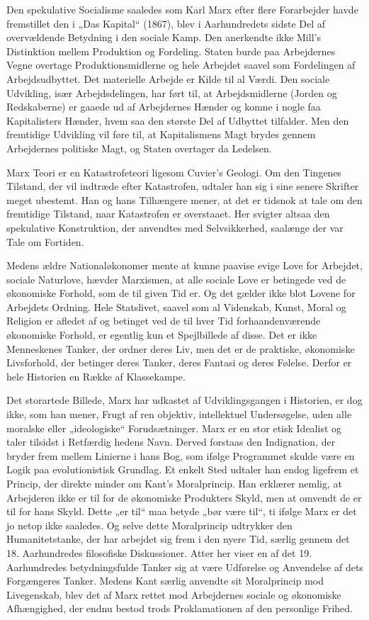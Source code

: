 \documentclass[12pt,a4paper,openany]{book}
\newcommand{\opage}[1]{\marginnote{\footnotesize\textit{[#1]}}}
\begin{document}
Den spekulative Socialisme saaledes som Karl Marx efter flere Forarbejder
havde fremstillet den i „Das Kapital“ (1867), blev i Aarhundredets
sidste Del af overvældende Betydning i den sociale Kamp.
Den anerkendte ikke Mill’s Distinktion mellem Produktion og Fordeling.
Staten burde paa Arbejdernes Vegne overtage Produktionsmidlerne
og hele Arbejdet saavel som Fordelingen af Arbejdsudbyttet.
Det materielle Arbejde er Kilde til al Værdi. Den sociale Udvikling,
især Arbejdsdelingen, har ført til, at Arbejdsmidlerne (Jorden
og Redskaberne) er gaaede ud af Arbejdernes Hænder og komne i
nogle faa Kapitalisters Hænder, hvem saa den største Del af Udbyttet
tilfalder. Men den fremtidige Udvikling vil føre til, at Kapitalismens
Magt brydes gennem Arbejdernes politiske Magt, og Staten overtager
da Ledelsen.

Marx Teori er en Katastrofeteori ligesom Cuvier’s Geologi. Om
den Tingenes Tilstand, der vil indtræde efter Katastrofen, udtaler
han sig i sine senere Skrifter meget ubestemt. Han og hans Tilhængere
mener, at det er tidsnok at tale om den fremtidige Tilstand,
naar Katastrofen er overstaaet. Her svigter altsaa den spekulative
Konstruktion, der anvendtes med Selvsikkerhed, saalænge der var
Tale om Fortiden.

Medens ældre Nationaløkonomer mente at kunne paavise evige
Love for Arbejdet, sociale Naturlove, hævder Marxismen, at alle
sociale Love er betingede ved de økonomiske Forhold, som de til
given Tid er. Og det gælder ikke blot Lovene for Arbejdets Ordning.
Hele Statslivet, saavel som al Videnskab, Kunst, Moral og Religion
er afledet af og betinget ved de til hver Tid forhaandenværende økonomiske
Forhold, er egentlig kun et Spejlbillede af disse. Det er ikke
Menneskenes Tanker, der ordner deres Liv, men det er de praktiske,
økonomiske Livsforhold, der betinger deres Tanker, deres Fantasi
og deres Følelse. Derfor er hele Historien en Række af Klassekampe.

Det storartede Billede, Marx har udkastet af Udviklingsgangen i
Historien, er dog ikke, som han mener, Frugt af ren objektiv, intellektuel
Undersøgelse, uden alle moralske eller „ideologiske“ Forudsætninger.
Marx er en stor etisk Idealist og taler tilsidst i Retfærdig%
\opage{96}hedens Navn. Derved forstaas den Indignation, der bryder frem
mellem Linierne i hans Bog, som ifølge Programmet skulde være en
Logik paa evolutionistisk Grundlag. Et enkelt Sted udtaler han endog
ligefrem et Princip, der direkte minder om Kant’s Moralprincip. Han
erklærer nemlig, at Arbejderen ikke er til for de økonomiske Produkters
Skyld, men at omvendt de er til for hans Skyld. Dette „er
til“ maa betyde „bør være til“, ti ifølge Marx er det jo netop ikke
saaledes. Og selve dette Moralprincip udtrykker den Humanitetstanke,
der har arbejdet sig frem i den nyere Tid, særlig gennem det
18. Aarhundredes filosofiske Diskussioner. Atter her viser en af det
19. Aarhundredes betydningsfulde Tanker sig at være Udførelse og
Anvendelse af dets Forgængeres Tanker. Medens Kant særlig anvendte
sit Moralprincip mod Livegenskab, blev det af Marx rettet
mod Arbejdernes sociale og økonomiske Afhængighed, der endnu
bestod trods Proklamationen af den personlige Frihed.
\end{document}
